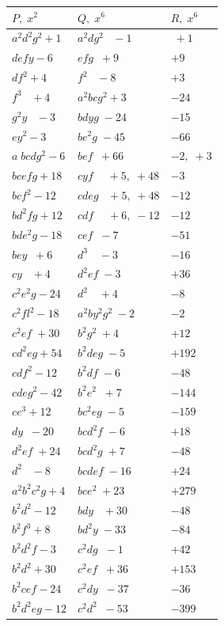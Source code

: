 \documentclass[11pt,a4paper]{article}
\begin{document}
\medskip
\noindent
\begin{tabular}{|l||l|l|}
\hline
$P,\;x^{2}$ & $Q,\;x^{6}$ & $R,\;x^{6}$\\
\hline
$a^{2}d^{2}g^{2}+1$ & $a^{2}dg^{2}\;\;\;-1$ & $\;+1$\\
$defy-6$ & $efg\;\;+9$ & $+9$\\
$df^{2}+4$ & $f^{2}\;\;\;-8$ & $+3$\\
$f^{3}\;\;\;+4$ & $a^{2}bcg^{2}+3$ & $-24$\\
$g^{2}y\;\;\;-3$ & $bdyg\;-24$ & $-15$\\
$ey^{2}-3$ & $be^{2}g\;-45$ & $-66$\\
$a\;bcdg^{2}-6$ & $bef\;\;+66$ & $-2,\;+3$\\
$bcefg+18$ & $cyf\;\;\;\;\,+5,\;+48$ & $-3$\\
$bcf^{2}-12$ & $cdeg\;\;\;+5,\;+48$ & $-12$\\
$bd^{2}fg+12$ & $cdf\;\;\;\;\,+6,\;-12$ & $-12$\\
$bde^{2}g-18$ & $cef\;\;-7$ & $-51$\\
$bey\;\;+6$ & $d^{3}\;\;\;\,-3$ & $-16$\\
$cy\;\;\;+4$ & $d^{2}ef\;-3$ & $+36$\\
$c^{2}e^{2}g-24$ & $d^{2}\;\;\;\,+4$ & $-8$\\
$c^{2}fl^{2}-18$ & $a^{2}by^{2}g^{2}\;-2$ & $-2$\\
$c^{2}ef\;+30$ & $b^{2}g^{2}\;+4$ & $+12$\\
$cd^{2}eg+54$ & $b^{2}deg\;-5$ & $+192$\\
$cdf^{2}-12$ & $b^{2}df\;-6$ & $-48$\\
$cdeg^{2}-42$ & $b^{2}e^{2}\;\;+7$ & $-144$\\
$ce^{3}+12$ & $bc^{2}eg\;-5$ & $-159$\\
$dy\;\;-20$ & $bcd^{2}f\;-6$ & $+18$\\
$d^{2}ef\;+24$ & $bcd^{2}g\;+7$ & $-48$\\
$d^{2}\;\;\;-8$ & $bcdef\;-16$ & $+24$\\
$a^{2}b^{2}c^{2}g+4$ & $bce^{2}\;+23$ & $+279$\\
$b^{2}d^{2}-12$ & $bdy\;\;\;+30$ & $-48$\\
$b^{2}f^{3}+8$ & $bd^{2}y\;-33$ & $-84$\\
$b^{2}d^{2}f-3$ & $c^{2}dg\;\;-1$ & $+42$\\
$b^{2}d^{2}+30$ & $c^{2}ef\;\;+36$ & $+153$\\
$b^{2}cef-24$ & $c^{2}dy\;\;-37$ & $-36$\\
$b^{2}d^{2}eg-12$ & $c^{2}d^{2}\;\;-53$ & $-399$\\

\end{tabular}
\end{document}
